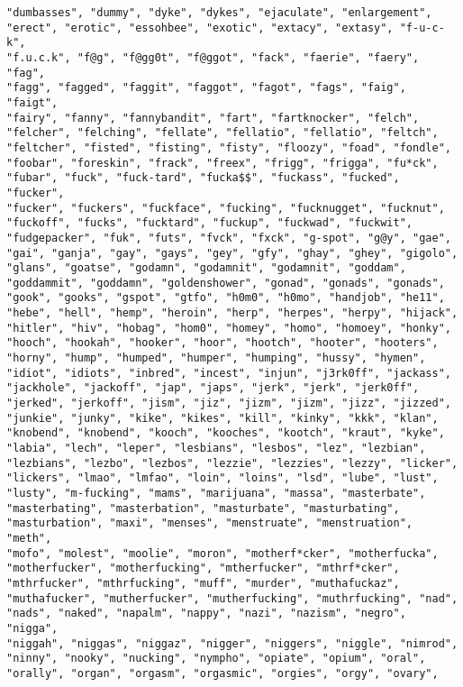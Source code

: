 \begin{lstlisting}
"dumbasses", "dummy", "dyke", "dykes", "ejaculate", "enlargement",
"erect", "erotic", "essohbee", "exotic", "extacy", "extasy", "f-u-c-k",
"f.u.c.k", "f@g", "f@gg0t", "f@ggot", "fack", "faerie", "faery", "fag",
"fagg", "fagged", "faggit", "faggot", "fagot", "fags", "faig", "faigt",
"fairy", "fanny", "fannybandit", "fart", "fartknocker", "felch",
"felcher", "felching", "fellate", "fellatio", "fellatio", "feltch",
"feltcher", "fisted", "fisting", "fisty", "floozy", "foad", "fondle",
"foobar", "foreskin", "frack", "freex", "frigg", "frigga", "fu*ck",
"fubar", "fuck", "fuck-tard", "fucka$$", "fuckass", "fucked", "fucker",
"fucker", "fuckers", "fuckface", "fucking", "fucknugget", "fucknut",
"fuckoff", "fucks", "fucktard", "fuckup", "fuckwad", "fuckwit",
"fudgepacker", "fuk", "futs", "fvck", "fxck", "g-spot", "g@y", "gae",
"gai", "ganja", "gay", "gays", "gey", "gfy", "ghay", "ghey", "gigolo",
"glans", "goatse", "godamn", "godamnit", "godamnit", "goddam",
"goddammit", "goddamn", "goldenshower", "gonad", "gonads", "gonads",
"gook", "gooks", "gspot", "gtfo", "h0m0", "h0mo", "handjob", "he11",
"hebe", "hell", "hemp", "heroin", "herp", "herpes", "herpy", "hijack",
"hitler", "hiv", "hobag", "hom0", "homey", "homo", "homoey", "honky",
"hooch", "hookah", "hooker", "hoor", "hootch", "hooter", "hooters",
"horny", "hump", "humped", "humper", "humping", "hussy", "hymen",
"idiot", "idiots", "inbred", "incest", "injun", "j3rk0ff", "jackass",
"jackhole", "jackoff", "jap", "japs", "jerk", "jerk", "jerk0ff",
"jerked", "jerkoff", "jism", "jiz", "jizm", "jizm", "jizz", "jizzed",
"junkie", "junky", "kike", "kikes", "kill", "kinky", "kkk", "klan",
"knobend", "knobend", "kooch", "kooches", "kootch", "kraut", "kyke",
"labia", "lech", "leper", "lesbians", "lesbos", "lez", "lezbian",
"lezbians", "lezbo", "lezbos", "lezzie", "lezzies", "lezzy", "licker",
"lickers", "lmao", "lmfao", "loin", "loins", "lsd", "lube", "lust",
"lusty", "m-fucking", "mams", "marijuana", "massa", "masterbate",
"masterbating", "masterbation", "masturbate", "masturbating",
"masturbation", "maxi", "menses", "menstruate", "menstruation", "meth",
"mofo", "molest", "moolie", "moron", "motherf*cker", "motherfucka",
"motherfucker", "motherfucking", "mtherfucker", "mthrf*cker",
"mthrfucker", "mthrfucking", "muff", "murder", "muthafuckaz",
"muthafucker", "mutherfucker", "mutherfucking", "muthrfucking", "nad",
"nads", "naked", "napalm", "nappy", "nazi", "nazism", "negro", "nigga",
"niggah", "niggas", "niggaz", "nigger", "niggers", "niggle", "nimrod",
"ninny", "nooky", "nucking", "nympho", "opiate", "opium", "oral",
"orally", "organ", "orgasm", "orgasmic", "orgies", "orgy", "ovary",

\end{lstlisting}
